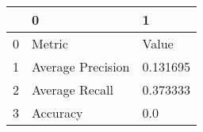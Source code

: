 \begin{tabular}{lll}
\toprule
{} &                  0 &         1 \\
\midrule
0 &             Metric &     Value \\
1 &  Average Precision &  0.131695 \\
2 &     Average Recall &  0.373333 \\
3 &           Accuracy &       0.0 \\
\bottomrule
\end{tabular}
